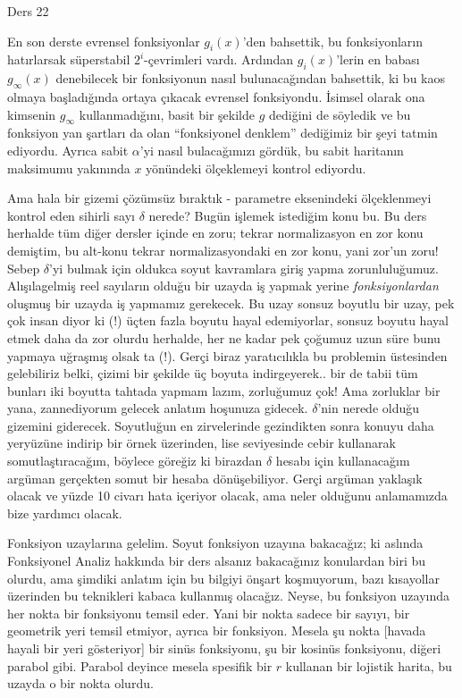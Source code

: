 \documentclass[12pt,fleqn]{article}\usepackage{../../common}
\begin{document}
Ders 22

En son derste evrensel fonksiyonlar $g_i(x)$'den bahsettik, bu fonksiyonların
hatırlarsak süperstabil $2^i$-çevrimleri vardı. Ardından $g_i(x)$'lerin en
babası $g_\infty(x)$ denebilecek bir fonksiyonun nasıl bulunacağından bahsettik,
ki bu kaos olmaya başladığında ortaya çıkacak evrensel fonksiyondu. İsimsel
olarak ona kimsenin $g_\infty$ kullanmadığını, basit bir şekilde $g$ dediğini de
söyledik ve bu fonksiyon yan şartları da olan ``fonksiyonel denklem'' dediğimiz
bir şeyi tatmin ediyordu. Ayrıca sabit $\alpha$'yi nasıl bulacağımızı gördük, bu
sabit haritanın maksimumu yakınında $x$ yönündeki ölçeklemeyi kontrol ediyordu.

Ama hala bir gizemi çözümsüz bıraktık - parametre eksenindeki ölçeklenmeyi
kontrol eden sihirli sayı $\delta$ nerede? Bugün işlemek istediğim konu bu. Bu
ders herhalde tüm diğer dersler içinde en zoru; tekrar normalizasyon en zor konu
demiştim, bu alt-konu tekrar normalizasyondaki en zor konu, yani zor'un zoru!
Sebep $\delta$'yi bulmak için oldukca soyut kavramlara giriş yapma
zorunluluğumuz. Alışılagelmiş reel sayıların olduğu bir uzayda iş yapmak yerine
{\em fonksiyonlardan} oluşmuş bir uzayda iş yapmamız gerekecek. Bu uzay sonsuz
boyutlu bir uzay, pek çok insan diyor ki (!) üçten fazla boyutu hayal
edemiyorlar, sonsuz boyutu hayal etmek daha da zor olurdu herhalde, her ne kadar
pek çoğumuz uzun süre bunu yapmaya uğraşmış olsak ta (!). Gerçi biraz
yaratıcılıkla bu problemin üstesinden gelebiliriz belki, çizimi bir şekilde üç
boyuta indirgeyerek.. bir de tabii tüm bunları iki boyutta tahtada yapmam lazım,
zorluğumuz çok! Ama zorluklar bir yana, zannediyorum gelecek anlatım hoşunuza
gidecek. $\delta$'nin nerede olduğu gizemini giderecek. Soyutluğun en
zirvelerinde gezindikten sonra konuyu daha yeryüzüne indirip bir örnek
üzerinden, lise seviyesinde cebir kullanarak somutlaştıracağım, böylece göreğiz
ki birazdan $\delta$ hesabı için kullanacağım argüman gerçekten somut bir hesaba
dönüşebiliyor. Gerçi argüman yaklaşık olacak ve yüzde 10 civarı hata içeriyor
olacak, ama neler olduğunu anlamamızda bize yardımcı olacak.

Fonksiyon uzaylarına gelelim. Soyut fonksiyon uzayına bakacağız; ki aslında
Fonksiyonel Analiz hakkında bir ders alsanız bakacağınız konulardan biri bu
olurdu, ama şimdiki anlatım için bu bilgiyi önşart koşmuyorum, bazı kısayollar
üzerinden bu teknikleri kabaca kullanmış olacağız. Neyse, bu fonksiyon uzayında
her nokta bir fonksiyonu temsil eder. Yani bir nokta sadece bir sayıyı, bir
geometrik yeri temsil etmiyor, ayrıca bir fonksiyon. Mesela şu nokta [havada
  hayali bir yeri gösteriyor] bir sinüs fonksiyonu, şu bir kosinüs fonksiyonu,
diğeri parabol gibi. Parabol deyince mesela spesifik bir $r$ kullanan bir
lojistik harita, bu uzayda o bir nokta olurdu.
\end{document}
